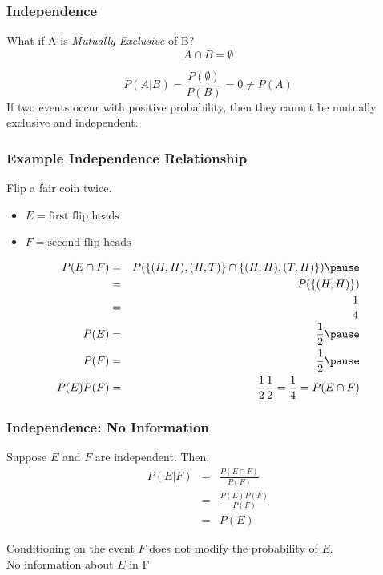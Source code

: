 \documentclass[handout]{beamer}
\numberwithin{equation}{section}
\begin{document}
\begin{frame}
\frametitle{Independence}
What if A is \emph{Mutually Exclusive} of B?\pause
 $$A\cap B=\emptyset$$\pause
 
  $$P(A|B)=\frac{P(\emptyset)}{P(B)}=0\neq P(A)$$
 \pause
 If two events occur with positive probability, then they cannot be mutually exclusive and independent.
 \end{frame}




\begin{frame}
\frametitle{Example Independence Relationship}

Flip a fair coin twice.  
\begin{itemize}
\item[] $E = \text{first flip heads} $
\item[] $F = \text{second flip heads} $
\end{itemize}\pause
\begin{eqnarray}
P(E \cap F ) & = & P( \{ (H, H) , (H, T) \} \cap \{ (H, H), (T, H) \} ) \nonumber \pause \\
 & =& P( \{(H, H)\} ) \nonumber \\ 
 & = & \frac{1}{4} \nonumber \\
P(E ) & = & \frac{1} {2} \nonumber \pause \\
P(F) & = & \frac{1}{2} \nonumber \pause \\
P(E)P(F)  & =& \frac{1}{2}\frac{1}{2} = \frac{1}{4}  =P(E \cap F )  \nonumber 
 \end{eqnarray} 
 
 

\end{frame}

\begin{frame}
\frametitle{Independence: No Information} 

Suppose $E$ and $F$ are independent.  Then, 
\begin{eqnarray}
P(E|F ) & = & \frac{P(E \cap F) }{P(F) } \nonumber \\
& = & \frac{P(E)P(F)}{P(F)}\nonumber \\
& = & P(E) \nonumber 
\end{eqnarray}


Conditioning on the event $F$ does not modify the probability of $E$.  \\
\alert{No information about $E$ in F}  \\

\end{frame}
\end{document}
